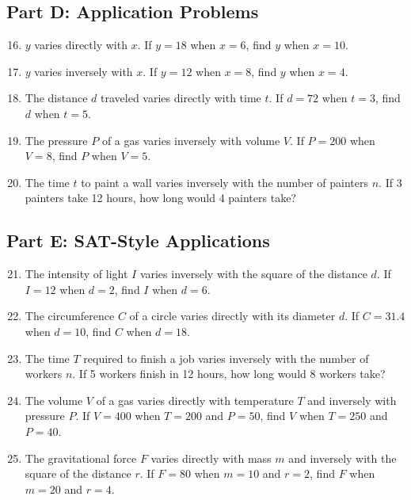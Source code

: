 \documentclass[14pt]{extarticle}
\begin{document}
\subsection*{Part D: Application Problems}
\begin{enumerate}
  \setcounter{enumi}{15}
  \item \(y\) varies directly with \(x\). If \(y = 18\) when \(x = 6\), find \(y\) when \(x = 10\).
  \item \(y\) varies inversely with \(x\). If \(y = 12\) when \(x = 8\), find \(y\) when \(x = 4\).
  \item The distance \(d\) traveled varies directly with time \(t\). If \(d = 72\) when \(t = 3\), find \(d\) when \(t = 5\).
  \item The pressure \(P\) of a gas varies inversely with volume \(V\). If \(P = 200\) when \(V = 8\), find \(P\) when \(V = 5\).
  \item The time \(t\) to paint a wall varies inversely with the number of painters \(n\). If 3 painters take 12 hours, how long would 4 painters take?
\end{enumerate}

\subsection*{Part E: SAT-Style Applications}
\begin{enumerate}
  \setcounter{enumi}{20}
  \item The intensity of light \(I\) varies inversely with the square of the distance \(d\). If \(I = 12\) when \(d = 2\), find \(I\) when \(d = 6\).
  \item The circumference \(C\) of a circle varies directly with its diameter \(d\). If \(C = 31.4\) when \(d = 10\), find \(C\) when \(d = 18\).
  \item The time \(T\) required to finish a job varies inversely with the number of workers \(n\). If 5 workers finish in 12 hours, how long would 8 workers take?
  \item The volume \(V\) of a gas varies directly with temperature \(T\) and inversely with pressure \(P\). If \(V = 400\) when \(T = 200\) and \(P = 50\), find \(V\) when \(T = 250\) and \(P = 40\).
  \item The gravitational force \(F\) varies directly with mass \(m\) and inversely with the square of the distance \(r\). If \(F = 80\) when \(m = 10\) and \(r = 2\), find \(F\) when \(m = 20\) and \(r = 4\).
\end{enumerate}
\end{document}
